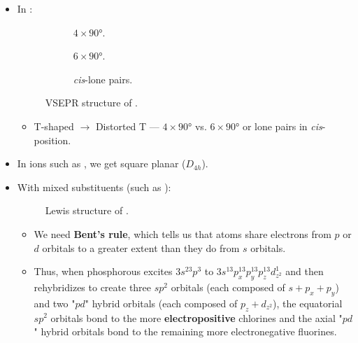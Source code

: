 \documentclass[../notes.tex]{subfiles}
\begin{document}
\begin{itemize}
\begin{itemize}
    \end{itemize}
    \item In :
    \begin{figure}[h!]
        \centering
        \begin{subfigure}[b]{0.2\linewidth}
            \centering
            \caption{$4\times\ang{90}$.}
            \label{fig:VSEPR-BrF3a}
        \end{subfigure}
        \begin{subfigure}[b]{0.2\linewidth}
            \centering
            \caption{$6\times\ang{90}$.}
            \label{fig:VSEPR-BrF3b}
        \end{subfigure}
        \begin{subfigure}[b]{0.2\linewidth}
            \centering
            \caption{\emph{cis}-lone pairs.}
            \label{fig:VSEPR-BrF3c}
        \end{subfigure}
        \caption{VSEPR structure of .}
        \label{fig:VSEPR-BrF3}
    \end{figure}
    \begin{itemize}
        \item T-shaped $\to$ Distorted T --- $4\times\ang{90}$ vs. $6\times\ang{90}$ or lone pairs in \emph{cis}-position.
    \end{itemize}
    \item In ions such as , we get square planar ($D_{4h}$).
    \item With mixed substituents (such as ):
    \begin{figure}[h!]
        \centering
        \caption{Lewis structure of .}
        \label{fig:Lewis-PF2Cl3}
    \end{figure}
    \begin{itemize}
        \item We need \textbf{Bent's rule}, which tells us that atoms share electrons from $p$ or $d$ orbitals to a greater extent than they do from $s$ orbitals.
        \item Thus, when phosphorous excites $3s^23p^3$ to $3s^13p_x^13p_y^13p_z^13d_{z^2}^1$ and then rehybridizes to create three $sp^2$ orbitals (each composed of $s+p_x+p_y$) and two "$pd$" hybrid orbitals (each composed of $p_z+d_{z^2}$), the equatorial $sp^2$ orbitals bond to the more \textbf{electropositive} chlorines and the axial "$pd$" hybrid orbitals bond to the remaining more electronegative fluorines.

\end{itemize}
\end{itemize}
\end{document}
